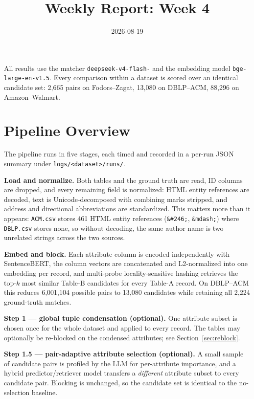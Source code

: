 \documentclass[11pt]{article}
\title{Weekly Report: Week 4}
\author{}
\date{2026-08-19}
\begin{document}
\maketitle

All results use the matcher
\texttt{deepseek-\allowbreak v4-\allowbreak flash-} and the embedding
model \texttt{bge-\allowbreak large-\allowbreak en-\allowbreak v1.5}. Every comparison within a dataset is scored over an identical
candidate set: 2{,}665 pairs on Fodors--Zagat, 13{,}080 on DBLP--ACM, 88{,}296 on
Amazon--Walmart.

\section{Pipeline Overview}

The pipeline runs in five stages, each timed and recorded in a per-run JSON summary under
\texttt{logs/<dataset>/runs/}.

\textbf{Load and normalize.} Both tables and the ground truth are read, ID columns are
dropped, and every remaining field is normalized: HTML entity references are decoded, text
is Unicode-decomposed with combining marks stripped, and address and directional
abbreviations are standardized. This matters more than it appears: \texttt{ACM.csv} stores
461 HTML entity references (\texttt{\&\#246;}, \texttt{\&mdash;}) where \texttt{DBLP.csv}
stores none, so without decoding, the same author name is two unrelated strings across the
two sources.

\textbf{Embed and block.} Each attribute column is encoded independently with SentenceBERT,
the column vectors are concatenated and L2-normalized into one embedding per record, and
multi-probe locality-sensitive hashing retrieves the top-$k$ most similar Table-B candidates
for every Table-A record. On DBLP--ACM this reduces 6{,}001{,}104 possible pairs to 13{,}080
candidates while retaining all 2{,}224 ground-truth matches.

\textbf{Step 1 --- global tuple condensation (optional).} One attribute subset is chosen
once for the whole dataset and applied to every record. The tables may optionally be
re-blocked on the condensed attributes; see Section~\ref{sec:reblock}.

\textbf{Step 1.5 --- pair-adaptive attribute selection (optional).} A small sample of
candidate pairs is profiled by the LLM for per-attribute importance, and a hybrid
predictor/retriever model transfers a \emph{different} attribute subset to every candidate
pair. Blocking is unchanged, so the candidate set is identical to the no-selection baseline.
\end{document}
